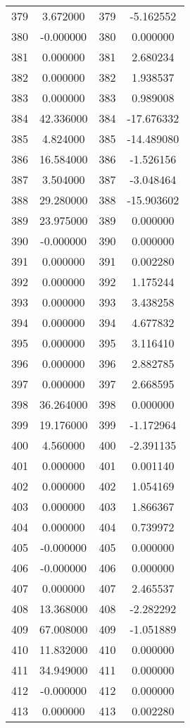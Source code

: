 \documentclass[12pt]{article}
\begin{document}
\begin{longtable}{@{}cccc@{}}
379 & 3.672000 & 379 & -5.162552 \\
380 & -0.000000 & 380 & 0.000000 \\
381 & 0.000000 & 381 & 2.680234 \\
382 & 0.000000 & 382 & 1.938537 \\
383 & 0.000000 & 383 & 0.989008 \\
384 & 42.336000 & 384 & -17.676332 \\
385 & 4.824000 & 385 & -14.489080 \\
386 & 16.584000 & 386 & -1.526156 \\
387 & 3.504000 & 387 & -3.048464 \\
388 & 29.280000 & 388 & -15.903602 \\
389 & 23.975000 & 389 & 0.000000 \\
390 & -0.000000 & 390 & 0.000000 \\
391 & 0.000000 & 391 & 0.002280 \\
392 & 0.000000 & 392 & 1.175244 \\
393 & 0.000000 & 393 & 3.438258 \\
394 & 0.000000 & 394 & 4.677832 \\
395 & 0.000000 & 395 & 3.116410 \\
396 & 0.000000 & 396 & 2.882785 \\
397 & 0.000000 & 397 & 2.668595 \\
398 & 36.264000 & 398 & 0.000000 \\
399 & 19.176000 & 399 & -1.172964 \\
400 & 4.560000 & 400 & -2.391135 \\
401 & 0.000000 & 401 & 0.001140 \\
402 & 0.000000 & 402 & 1.054169 \\
403 & 0.000000 & 403 & 1.866367 \\
404 & 0.000000 & 404 & 0.739972 \\
405 & -0.000000 & 405 & 0.000000 \\
406 & -0.000000 & 406 & 0.000000 \\
407 & 0.000000 & 407 & 2.465537 \\
408 & 13.368000 & 408 & -2.282292 \\
409 & 67.008000 & 409 & -1.051889 \\
410 & 11.832000 & 410 & 0.000000 \\
411 & 34.949000 & 411 & 0.000000 \\
412 & -0.000000 & 412 & 0.000000 \\
413 & 0.000000 & 413 & 0.002280 \\

\end{longtable}
\end{document}
